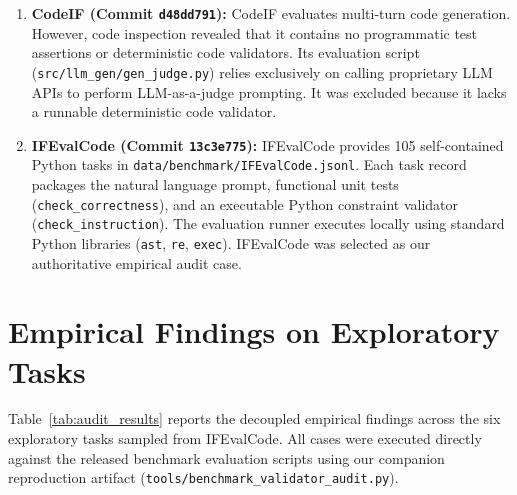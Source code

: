 \documentclass[runningheads]{llncs}
\begin{document}
\begin{enumerate}[leftmargin=*]
    \item \textbf{CodeIF \cite{yan_codeif_2025} (Commit \texttt{d48dd791}):} CodeIF evaluates multi-turn code generation. However, code inspection revealed that it contains no programmatic test assertions or deterministic code validators. Its evaluation script (\texttt{src/llm\_gen/gen\_judge.py}) relies exclusively on calling proprietary LLM APIs to perform LLM-as-a-judge prompting. It was excluded because it lacks a runnable deterministic code validator.
    \item \textbf{IFEvalCode \cite{yang_ifevalcode_2025} (Commit \texttt{13c3e775}):} IFEvalCode provides 105 self-contained Python tasks in \texttt{data/benchmark/IFEvalCode.jsonl}. Each task record packages the natural language prompt, functional unit tests (\texttt{check\_correctness}), and an executable Python constraint validator (\texttt{check\_instruction}). The evaluation runner executes locally using standard Python libraries (\texttt{ast}, \texttt{re}, \texttt{exec}). IFEvalCode was selected as our authoritative empirical audit case.
\end{enumerate}

\section{Empirical Findings on Exploratory Tasks}
\label{sec:findings}

Table~\ref{tab:audit_results} reports the decoupled empirical findings across the six exploratory tasks sampled from IFEvalCode. All cases were executed directly against the released benchmark evaluation scripts using our companion reproduction artifact (\texttt{tools/benchmark\_validator\_audit.py}).
\end{document}
